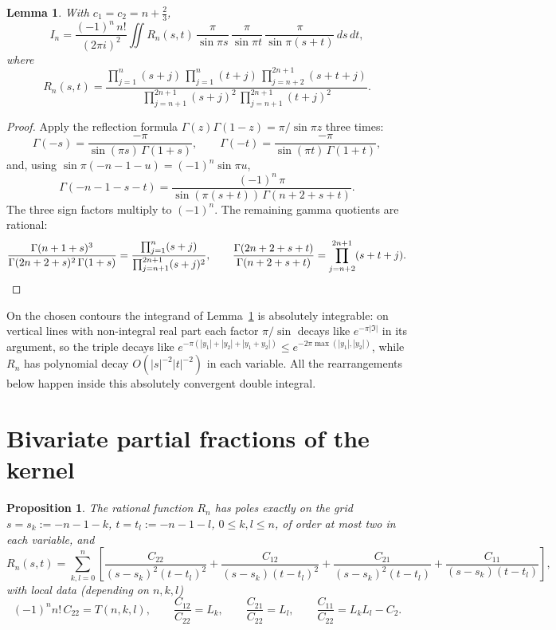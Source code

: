 \documentclass[11pt]{article}
\newtheorem{proposition}{Proposition}
\newtheorem{lemma}{Lemma}
\theoremstyle{remark}
\begin{document}
\begin{lemma}\label{lem:kernel}
With $c_1=c_2=n+\frac23$,
\[
 I_n=\frac{(-1)^n\,n!}{(2\pi i)^2}
 \iint R_n(s,t)\,
 \frac{\pi}{\sin\pi s}\,\frac{\pi}{\sin\pi t}\,\frac{\pi}{\sin\pi(s+t)}
 \,ds\,dt,
\]
where
\[
 R_n(s,t)=
 \frac{\prod_{j=1}^n(s+j)\,\prod_{j=1}^n(t+j)\,\prod_{j=n+2}^{2n+1}(s+t+j)}
      {\prod_{j=n+1}^{2n+1}(s+j)^2\,\prod_{j=n+1}^{2n+1}(t+j)^2}.
\]
\end{lemma}

\begin{proof}
Apply the reflection formula $\Gamma(z)\Gamma(1-z)=\pi/\sin\pi z$ three
times:
\[
 \Gamma(-s)=\frac{-\pi}{\sin(\pi s)\,\Gamma(1+s)},\qquad
 \Gamma(-t)=\frac{-\pi}{\sin(\pi t)\,\Gamma(1+t)},
\]
and, using $\sin\pi(-n-1-u)=(-1)^{n}\sin\pi u$,
\[
 \Gamma(-n-1-s-t)=\frac{(-1)^n\,\pi}{\sin(\pi(s+t))\,\Gamma(n+2+s+t)} .
\]
The three sign factors multiply to $(-1)^n$.  The remaining gamma quotients
are rational:
\[
 \frac{\Gamma(n+1+s)^3}{\Gamma(2n+2+s)^2\,\Gamma(1+s)}
 =\frac{\prod_{j=1}^n(s+j)}{\prod_{j=n+1}^{2n+1}(s+j)^2},
 \qquad
 \frac{\Gamma(2n+2+s+t)}{\Gamma(n+2+s+t)}
 =\prod_{j=n+2}^{2n+1}(s+t+j). \qedhere
\]
\end{proof}

On the chosen contours the integrand of Lemma~\ref{lem:kernel} is absolutely
integrable: on vertical lines with non-integral real part each factor
$\pi/\sin$ decays like $e^{-\pi|\Im|}$ in its argument, so the triple decays
like $e^{-\pi(|y_1|+|y_2|+|y_1+y_2|)}\le e^{-2\pi\max(|y_1|,|y_2|)}$, while
$R_n$ has polynomial decay $O(|s|^{-2}|t|^{-2})$ in each variable.  All the
rearrangements below happen inside this absolutely convergent double
integral.

\section{Bivariate partial fractions of the kernel}\label{sec:pf}

\begin{proposition}\label{prop:pf}
The rational function $R_n$ has poles exactly on the grid
$s=s_k:=-n-1-k$, $t=t_l:=-n-1-l$, $0\le k,l\le n$, of order at most two in
each variable, and
\[
 R_n(s,t)=\sum_{k,l=0}^{n}\left[
 \frac{C_{22}}{(s-s_k)^2(t-t_l)^2}
 +\frac{C_{12}}{(s-s_k)(t-t_l)^2}
 +\frac{C_{21}}{(s-s_k)^2(t-t_l)}
 +\frac{C_{11}}{(s-s_k)(t-t_l)}\right],
\]
with local data (depending on $n,k,l$)
\[
 (-1)^n n!\,C_{22}=T(n,k,l),\qquad
 \frac{C_{12}}{C_{22}}=L_k,\qquad
 \frac{C_{21}}{C_{22}}=L_l,\qquad
 \frac{C_{11}}{C_{22}}=L_kL_l-C_2 .
\]
\end{proposition}
\end{document}
